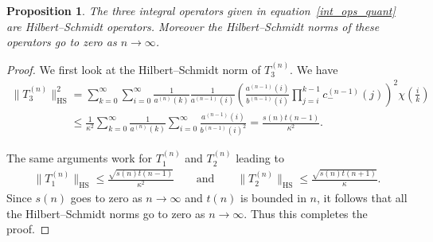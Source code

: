 \documentclass[11pt]{article}
\numberwithin{equation}{section}
\newtheorem{prop}[theo]{Proposition}
{\theoremstyle{definition}
\newtheorem{rem}[theo]{Remark}
\newtheorem{defin}[theo]{Definition}
}
\begin{document}
\begin{prop}
\label{hs_norm_quant_T}
The three integral operators given in equation~\eqref{int_ops_quant} are Hilbert--Schmidt operators.
Moreover the Hilbert--Schmidt norms of these operators go to zero as $n\to\infty$.
\end{prop}

\begin{proof}
We f\/irst look at the Hilbert--Schmidt norm of $T_3^{(n)}$.
We have
\begin{gather*}
\|T_3^{(n)}\|_{\textrm{HS}}^2 = \sum\limits_{k=0}^\infty \sum\limits_{i=0}^\infty
\frac{1}{a^{(n)}(k)}\frac{1}{a^{(n-1)}(i)}\left(\frac{a^{(n-1)}(i)}{b^{(n-1)}(i)}\prod\limits_{j=i}^{k-1}c_-^{(n-1)}(j)\right)^2
\chi\left(\frac{i}{k}\right)
\\
\phantom{\|T_3^{(n)}\|_{\textrm{HS}}^2}
\le \frac{1}{\kappa^2}\sum\limits_{k=0}^\infty
\frac{1}{a^{(n)}(k)}\sum\limits_{i=0}^\infty\frac{a^{(n-1)}(i)}{b^{(n-1)}(i)^2} = \frac{s(n)t(n-1)}{\kappa^2}.
\end{gather*}

The same arguments work for $T_1^{(n)}$ and $T_2^{(n)}$ leading to
\begin{gather*}
\|T_1^{(n)}\|_{\textrm{HS}}\le \frac{\sqrt{s(n)t(n-1)}}{\kappa^2}
\qquad
\textrm{and}
\qquad
\|T_2^{(n)}\|_{\textrm{HS}}\le \frac{\sqrt{s(n)t(n+1)}}{\kappa}.
\end{gather*}
Since $s(n)$ goes to zero as $n\to\infty$ and $t(n)$ is bounded in $n$, it follows that all the Hilbert--Schmidt norms
go to zero as $n\to\infty$.
Thus this completes the proof.
\end{proof}
\end{document}
